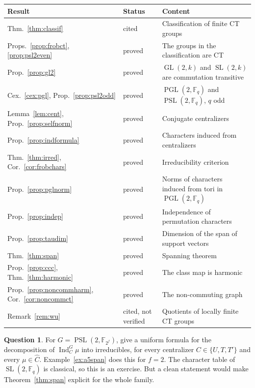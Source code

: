 \documentclass[12pt,letterpaper]{article}
\numberwithin{equation}{section}
\theoremstyle{plain}
\theoremstyle{definition}
\newtheorem{question}[theorem]{Question}
\newcommand{\F}{\mathbb{F}}
\DeclareMathOperator{\Ind}{Ind}
\DeclareMathOperator{\GL}{GL}
\DeclareMathOperator{\SL}{SL}
\DeclareMathOperator{\PGL}{PGL}
\DeclareMathOperator{\PSL}{PSL}
\begin{document}
\begin{center}
\renewcommand{\arraystretch}{1.15}
\begin{tabular}{>{\raggedright}p{4.6cm}>{\raggedright}p{2.2cm}>{\raggedright\arraybackslash}p{7cm}}
\toprule
Result & Status & Content\\
\midrule
Thm.~\ref{thm:classif} & cited & Classification of finite CT groups\\
Props.~\ref{prop:frobct}, \ref{prop:psl2even} & proved & The groups in the
classification are CT\\
Prop.~\ref{prop:gl2} & proved & $\GL(2,k)$ and $\SL(2,k)$ are commutation
transitive\\
Cex.~\ref{cex:pgl}, Prop.~\ref{prop:psl2odd} & proved & $\PGL(2,\F_q)$ and
$\PSL(2,\F_q)$, $q$ odd\\
Lemma~\ref{lem:cent}, Prop.~\ref{prop:selfnorm} & proved & Conjugate
centralizers\\
Prop.~\ref{prop:indformula} & proved & Characters induced from
centralizers\\
Thm.~\ref{thm:irred}, Cor.~\ref{cor:frobchars} & proved & Irreducibility
criterion\\
Prop.~\ref{prop:pglnorm} & proved & Norms of characters induced from tori
in $\PGL(2,\F_q)$\\
Prop.~\ref{prop:indep} & proved & Independence of permutation characters\\
Prop.~\ref{prop:taudim} & proved & Dimension of the span of support
vectors\\
Thm.~\ref{thm:span} & proved & Spanning theorem\\
Prop.~\ref{prop:ccc}, Thm.~\ref{thm:harmonic} & proved & The class map is
harmonic\\
Prop.~\ref{prop:noncommharm}, Cor.~\ref{cor:noncommct} & proved & The
non-commuting graph\\
Remark~\ref{rem:wu} & cited, not verified & Quotients of locally finite CT
groups\\
\bottomrule
\end{tabular}
\end{center}

\begin{question}\label{q:psl}
For $G=\PSL(2,\F_{2^f})$, give a uniform formula for the decomposition of
$\Ind_C^G\mu$ into irreducibles, for every centralizer $C\in\{U,T,T'\}$ and
every $\mu\in\widehat C$. Example~\ref{ex:a5span} does this for $f=2$. The
character table of $\SL(2,\F_q)$ is classical, so this is an exercise. But a
clean statement would make Theorem~\ref{thm:span} explicit for the whole
family.
\end{question}
\end{document}
